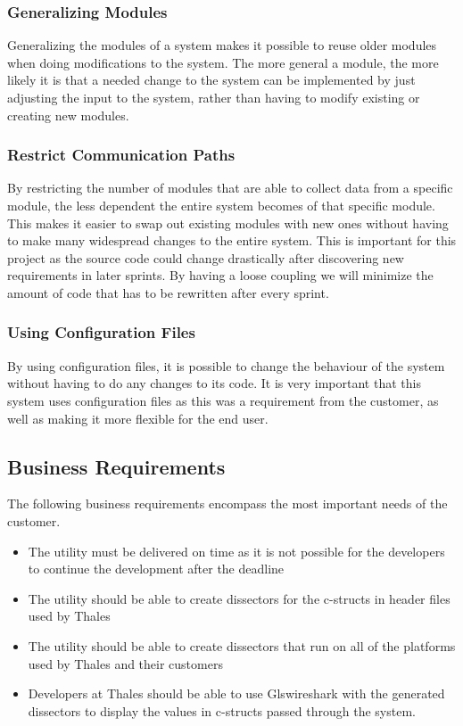 \subsubsection{Generalizing Modules}
Generalizing the modules of a system makes it possible to reuse older modules when doing modifications to the system. The more general a module, the more likely it is that a needed change to the system can be implemented by just adjusting the input to the system, rather than having to modify existing or creating new modules.

\subsubsection{Restrict Communication Paths}
By restricting the number of modules that are able to collect data from a specific module, the less dependent the entire system becomes of that specific module. This makes it easier to swap out existing modules with new ones without having to make many widespread changes to the entire system. This is important for this project as the source code could change drastically after discovering new requirements in later sprints. By having a loose coupling we will minimize the amount of code that has to be rewritten after every sprint.

\subsubsection{Using Configuration Files}
By using configuration files, it is possible to change the behaviour of the system without having to do any changes to its code. It is very important that this system uses configuration files as this was a requirement from the customer, as well as making it more flexible for the end user.

\subsection{Business Requirements}
The following business requirements encompass the most important needs of the customer.
\begin{itemize}
\item The \gls{utility} must be delivered on time as it is not possible for the developers to continue the development after the deadline
\item The \gls{utility} should be able to create \glspl{dissector} for the \Gls{c}-\glspl{struct} in \gls{header} files used by Thales
\item The \gls{utility} should be able to create \glspl{dissector} that run on all of the platforms used by Thales and their customers
\item Developers at Thales should be able to use Gls{wireshark} with the generated \glspl{dissector} to display the values in \Gls{c}-\glspl{struct} passed through the system.
\end{itemize}

